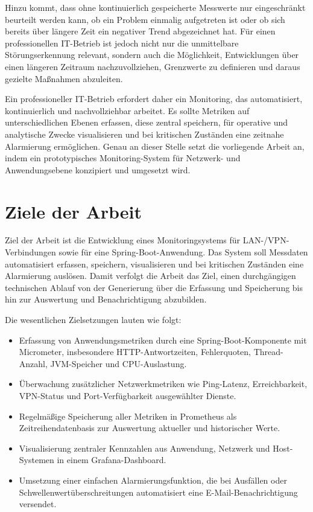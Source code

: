 Hinzu kommt, dass ohne kontinuierlich gespeicherte Messwerte nur eingeschränkt beurteilt werden kann, ob ein Problem einmalig aufgetreten ist oder ob sich bereits über längere Zeit ein negativer Trend abgezeichnet hat. Für einen professionellen IT-Betrieb ist jedoch nicht nur die unmittelbare Störungserkennung relevant, sondern auch die Möglichkeit, Entwicklungen über einen längeren Zeitraum nachzuvollziehen, Grenzwerte zu definieren und daraus gezielte Maßnahmen abzuleiten.

Ein professioneller IT-Betrieb erfordert daher ein Monitoring, das automatisiert, kontinuierlich und nachvollziehbar arbeitet. Es sollte Metriken auf unterschiedlichen Ebenen erfassen, diese zentral speichern, für operative und analytische Zwecke visualisieren und bei kritischen Zuständen eine zeitnahe Alarmierung ermöglichen. Genau an dieser Stelle setzt die vorliegende Arbeit an, indem ein prototypisches Monitoring-System für Netzwerk- und Anwendungsebene konzipiert und umgesetzt wird.

\section{Ziele der Arbeit}

Ziel der Arbeit ist die Entwicklung eines Monitoringsystems für LAN-/VPN-Verbindungen sowie für eine Spring-Boot-Anwendung. Das System soll Messdaten automatisiert erfassen, speichern, visualisieren und bei kritischen Zuständen eine Alarmierung auslösen. Damit verfolgt die Arbeit das Ziel, einen durchgängigen technischen Ablauf von der Generierung über die Erfassung und Speicherung bis hin zur Auswertung und Benachrichtigung abzubilden.  

Die wesentlichen Zielsetzungen lauten wie folgt:  

\begin{itemize}
    \item Erfassung von Anwendungsmetriken durch eine Spring-Boot-Komponente mit Micrometer, insbesondere HTTP-Antwortzeiten, Fehlerquoten, Thread-Anzahl, JVM-Speicher und CPU-Auslastung.  
    
    \item Überwachung zusätzlicher Netzwerkmetriken wie Ping-Latenz, Erreichbarkeit, VPN-Status und Port-Verfügbarkeit ausgewählter Dienste.  
    
    \item Regelmäßige Speicherung aller Metriken in Prometheus als Zeitreihendatenbasis zur Auswertung aktueller und historischer Werte.  
    
    \item Visualisierung zentraler Kennzahlen aus Anwendung, Netzwerk und Host-Systemen in einem Grafana-Dashboard.  
    
    \item Umsetzung einer einfachen Alarmierungsfunktion, die bei Ausfällen oder Schwellenwertüberschreitungen automatisiert eine E-Mail-Benachrichtigung versendet.  
\end{itemize}

